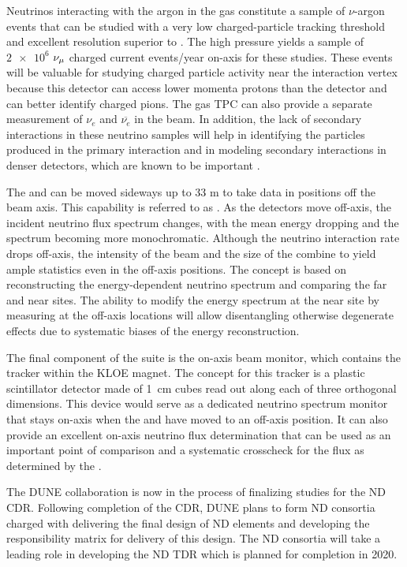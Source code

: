 Neutrinos interacting with the argon in the gas  constitute a sample of $\nu$-argon events that can be studied with a very low charged-particle tracking threshold and excellent resolution superior to . The high pressure yields a sample of $\num{2e6}$ $\nu_\mu$ charged current events/year on-axis for these studies. These events will be valuable for studying charged particle activity near the interaction vertex because this detector can access lower momenta protons than the  detector and can better identify charged pions.  The gas TPC can also provide a separate measurement of $\nu_e$ and $\overline{\nu_e}$ in the beam. In addition, the lack of secondary interactions in these neutrino samples will help in identifying the particles produced in the primary interaction and in modeling secondary interactions in denser detectors, which are known to be important \cite{Friedland:2018vry}.

The  and  can be moved sideways up to 33 m to take data in positions off the beam axis.  This capability is referred to as . As the detectors move off-axis, the incident neutrino flux spectrum changes, with the mean energy dropping and the spectrum becoming more monochromatic.  Although the neutrino interaction rate drops off-axis, the intensity of the beam and the size of the   combine to yield ample statistics even in the off-axis positions.
The  concept is based on reconstructing the energy-dependent neutrino spectrum and
comparing the far and near sites. The ability to modify the energy spectrum at the near site by measuring at the off-axis locations will allow disentangling otherwise degenerate effects due to systematic biases of the energy reconstruction.

The final component of the   suite is the on-axis beam monitor, which contains the
 tracker within the KLOE magnet.  The concept for this tracker is a  plastic scintillator detector made of \SI{1}{cm} cubes read out along each of three orthogonal dimensions.  
This device would serve as a dedicated  neutrino spectrum monitor that stays on-axis  when the  and  have moved to an off-axis position. 
It can also provide an excellent on-axis neutrino flux determination that can be used as an important point of comparison and a systematic crosscheck for the flux as determined by the .

The DUNE collaboration is now in the process of finalizing studies for the ND CDR.  Following completion of the CDR, DUNE plans to form ND consortia charged with delivering the final design of ND elements and developing the responsibility matrix for delivery of this design.  The ND consortia will take a leading role in developing the ND TDR which is planned for completion in 2020.

